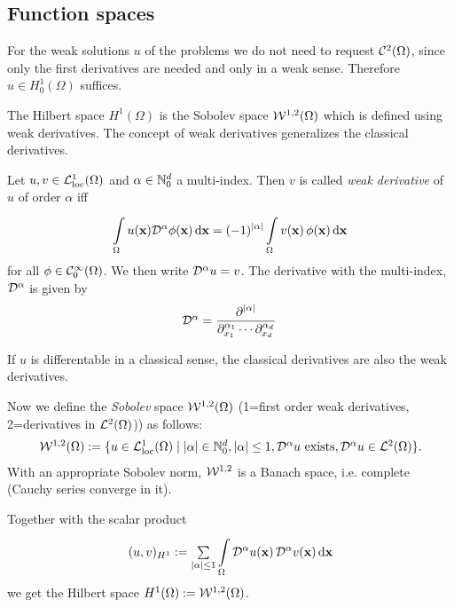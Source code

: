 \subsection{Function spaces}
\label{sec:hilbert}
%
For the weak solutions $u$ of the problems we do not need to request $\mathcal{C}^2(\Omega)$, since only the first derivatives are needed and only in a weak sense. Therefore $u\in H^1_0(\Omega)$ suffices.

The Hilbert space $H^1(\Omega)$ is the Sobolev space $\mathcal{W}^{1,2}(\Omega)$ which is defined using weak derivatives. The concept of weak derivatives generalizes the classical derivatives.

Let $u,v\in \mathcal{L}^1_{\text{loc}}(\Omega)$ and $\alpha \in \mathbb{N}^d_0$ a multi-index. Then $v$ is called \emph{weak derivative} of $u$ of order $\alpha$ iff
\begin{equation}
  \begin{array}{ll}
    \i{\Omega}{}u(\bfx) \D^\alpha \phi(\bfx) \,\d \bfx = (-1)^{|\alpha|} \i{\Omega}{} v(\bfx)\,\phi(\bfx)\,\d \bfx
  \end{array}
\end{equation}
for all $\phi \in \mathcal{C}^\infty_0(\Omega)$. We then write $\mathcal{D}^\alpha u = v$. The derivative with the multi-index, $\mathcal{D}^\alpha$ is given by
\begin{equation}
  \begin{array}{ll}
    \D^\alpha = \dfrac{\p^{|\alpha|}}{\p^{\alpha_1}_{x_1} \cdots \p^{\alpha_d}_{x_d}}
  \end{array}
\end{equation}

If $u$ is differentable in a classical sense, the classical derivatives are also the weak derivatives. 

Now we define the \emph{Sobolev} space $\mathcal{W}^{1,2}(\Omega)$ (1=first order weak derivatives, 2=derivatives in $\mathcal{L}^2(\Omega)$)) as follows:
\begin{equation}
  \begin{array}{ll}
    \mathcal{W}^{1,2}(\Omega) := \{ u \in \mathcal{L}^1_{\text{loc}}(\Omega) \mid |\alpha| \in \mathbb{N}^d_0, |\alpha| \leq 1, \mathcal{D}^\alpha u \text{ exists}, \mathcal{D}^\alpha u \in \mathcal{L}^2(\Omega)\}.
  \end{array}
\end{equation}
With an appropriate Sobolev norm, $\mathcal{W}^{1,2}$ is a Banach space, i.e. complete (Cauchy series converge in it).

Together with the scalar product
\begin{equation}
  \begin{array}{ll}
    (u,v)_{H^1} := \sum\limits_{|\alpha|\leq 1} \i{\Omega}{}{\D^\alpha u(\bfx) \,\D^\alpha v(\bfx) \,\d\bfx}
  \end{array}
\end{equation}
we get the Hilbert space $H^1(\Omega) := \mathcal{W}^{1,2}(\Omega)$.

